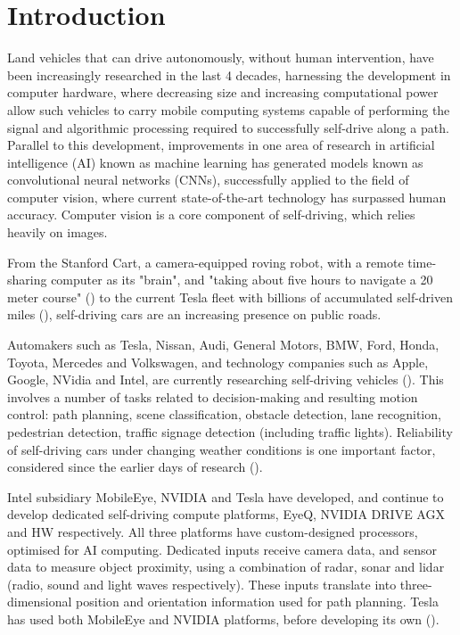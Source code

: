 \section{Introduction}
\label{introduction}
Land vehicles that can drive autonomously, without human intervention, have been increasingly researched in the last 4 decades, harnessing the development in computer hardware, where decreasing size and increasing computational power allow such vehicles to carry mobile computing systems capable of performing the signal and algorithmic processing required to successfully self-drive along a path. Parallel to this development, improvements in one area of research in artificial intelligence (AI) known as machine learning has generated models known as convolutional neural networks (CNNs), successfully applied to the field of computer vision, where current state-of-the-art technology has surpassed human accuracy. Computer vision is a core component of self-driving, which relies heavily on images. 

From the Stanford Cart, a camera-equipped roving robot, with a remote time-sharing computer as its "brain", and "taking about five hours to navigate a 20 meter course" (\cite{3899}) to the current Tesla fleet with billions of accumulated self-driven miles (\cite{AIFSD:2020}), self-driving cars are an increasing presence on public roads.

Automakers such as Tesla, Nissan, Audi, General Motors, BMW, Ford, Honda, Toyota, Mercedes and Volkswagen, and technology companies such as Apple, Google, NVidia and Intel, are currently researching self-driving vehicles (\cite{app10082749}). This involves a number of tasks related to decision-making and resulting motion control: path planning, scene classification, obstacle detection, lane recognition, pedestrian detection, traffic signage detection (including traffic lights). 
Reliability of self-driving cars under changing weather conditions is one important factor, considered since the earlier days of research (\cite{3899}). 

Intel subsidiary MobileEye, NVIDIA and Tesla have developed, and continue to develop dedicated self-driving compute platforms, EyeQ, NVIDIA DRIVE AGX and HW respectively. All three platforms have custom-designed processors, optimised for AI computing. Dedicated inputs receive camera data, and sensor data to measure object proximity, using a combination of radar, sonar and lidar (radio, sound and light waves respectively). These inputs translate into three-dimensional position and orientation information used for path planning.
Tesla has used both MobileEye and NVIDIA platforms, before developing its own (\cite{wiki:TeslaAutopilot}).

